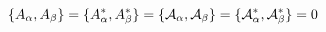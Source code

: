 \begin{equation}
\{ A_\alpha, A_\beta \}=\{ A_\alpha^*, A_\beta^* \}=\{ {\cal{A}}_\alpha, {\cal{A}}_\beta \}=\{ {\cal{A}}_\alpha^*, {\cal{A}}_\beta^* \}=0
\end{equation}

